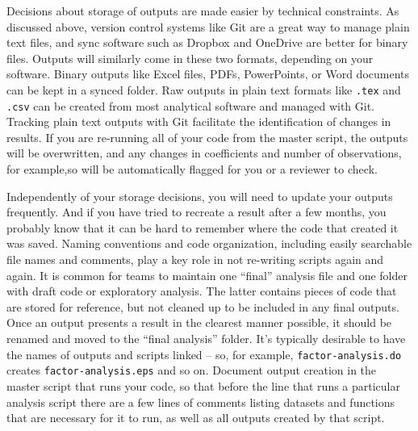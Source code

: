 Decisions about storage of outputs are made easier by technical constraints.
As discussed above, version control systems like Git are a great way to manage
plain text files, and sync software such as Dropbox and OneDrive are better for binary files.
Outputs will similarly come in these two formats, depending on your software.
Binary outputs like Excel files, PDFs, PowerPoints, or Word documents can be kept in a synced folder.
Raw outputs in plain text formats like \texttt{.tex} and \texttt{.csv}
can be created from most analytical software and managed with Git.
Tracking plain text outputs with Git facilitate the identification of changes in results.
If you are re-running all of your code from the master script,
the outputs will be overwritten,
and any changes in coefficients and number of observations, for example,so
will be automatically flagged for you or a reviewer to check.

Independently of your storage decisions,
you will need to update your outputs frequently.
And if you have tried to recreate a result after a few months,
you probably know that it can be hard to remember where the code that created it was saved.
Naming conventions and code organization,
including easily searchable file names and comments,
play a key role in not re-writing scripts again and again.
It is common for teams to maintain one ``final'' analysis file
and one folder with draft code or exploratory analysis.
The latter contains pieces of code that are stored for reference,
but not cleaned up to be included in any final outputs.
Once an output presents a result in the clearest manner possible,
it should be renamed and moved to the ``final analysis'' folder.
It's typically desirable to have the names of outputs and scripts linked --
so, for example, \texttt{factor-analysis.do} creates \texttt{factor-analysis.eps} and so on.
Document output creation in the master script that runs your code,
so that before the line that runs a particular analysis script
there are a few lines of comments listing
datasets and functions that are necessary for it to run,
as well as all outputs created by that script.


